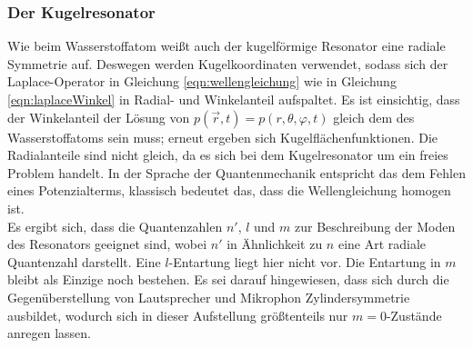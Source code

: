 \subsubsection{Der Kugelresonator}
\label{subsubsec:kugelresonator}
Wie beim Wasserstoffatom weißt auch der kugelförmige Resonator eine radiale Symmetrie auf. Deswegen werden Kugelkoordinaten verwendet, sodass sich der Laplace-Operator in Gleichung \eqref{eqn:wellengleichung} wie in Gleichung \eqref{eqn:laplaceWinkel} in Radial- und Winkelanteil aufspaltet. Es ist einsichtig, dass der Winkelanteil der Lösung von $p(\vec{r}, t) = p(r,\theta,\varphi,t)$ gleich dem des Wasserstoffatoms sein muss; erneut ergeben sich Kugelflächenfunktionen. Die Radialanteile sind nicht gleich, da es sich bei dem Kugelresonator um ein freies Problem handelt. In der Sprache der Quantenmechanik entspricht das dem Fehlen eines Potenzialterms, klassisch bedeutet das, dass die Wellengleichung homogen ist.\\
Es ergibt sich, dass die Quantenzahlen $n'$, $l$ und $m$ zur Beschreibung der Moden des Resonators geeignet sind, wobei $n'$ in Ähnlichkeit zu $n$ eine Art radiale Quantenzahl darstellt. Eine $l$-Entartung liegt hier nicht vor. Die Entartung in $m$ bleibt als Einzige noch bestehen. Es sei darauf hingewiesen, dass sich durch die Gegenüberstellung von Lautsprecher und Mikrophon Zylindersymmetrie ausbildet, wodurch sich in dieser Aufstellung größtenteils nur $m=0$-Zustände anregen lassen.
